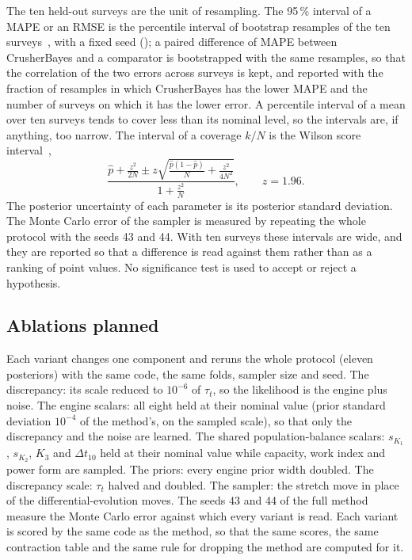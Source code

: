 \documentclass[journal]{IEEEtran}
\newcommand{\pct}{\,\%}
\begin{document}
The ten held-out surveys are the unit of resampling. The 95\pct{} interval of a MAPE or an RMSE is the percentile interval of
\nBoot{} bootstrap resamples of the ten surveys~\cite{efron}, with a fixed seed (\bootSeed); a paired difference of MAPE
between CrusherBayes and a comparator is bootstrapped with the same resamples, so that the correlation of the two errors
across surveys is kept, and reported with the fraction of resamples in which CrusherBayes has the lower MAPE and the number
of surveys on which it has the lower error. A percentile interval of a mean over ten surveys tends to cover less than its
nominal level, so the intervals are, if anything, too narrow. The interval of a coverage $k/N$ is the Wilson score interval~\cite{wilson},
\begin{equation}
\frac{\hat p+\frac{z^2}{2N}\pm z\sqrt{\frac{\hat p(1-\hat p)}{N}+\frac{z^2}{4N^2}}}{1+\frac{z^2}{N}},\qquad z=1.96.
\label{eq:wilson}
\end{equation}
The posterior uncertainty of each parameter is its posterior standard deviation. The Monte Carlo error of the sampler is
measured by repeating the whole protocol with the seeds 43 and 44. With ten surveys these intervals are wide, and they are
reported so that a difference is read against them rather than as a ranking of point values. No significance test is used
to accept or reject a hypothesis.

\subsection{Ablations planned}

Each variant changes one component and reruns the whole protocol (eleven posteriors) with the same code, the same folds,
sampler size and seed. The discrepancy: its scale reduced to $10^{-6}$ of $\tau_t$, so the likelihood is the engine plus
noise. The engine scalars: all eight held at their nominal value (prior standard deviation $10^{-4}$ of the method's, on
the sampled scale), so that only the discrepancy and the noise are learned. The shared population-balance scalars: $s_{K_1}$, $s_{K_2}$, $K_3$ and
$\Delta t_{10}$ held at their nominal value while capacity, work index and power form are sampled. The priors: every engine
prior width doubled. The discrepancy scale: $\tau_t$ halved and doubled. The sampler: the stretch move in place of the
differential-evolution moves. The seeds 43 and 44 of the full method measure the Monte Carlo error against which every
variant is read. Each variant is scored by the same code as the method, so that the same scores, the same contraction
table and the same rule for dropping the method are computed for it.
\end{document}
